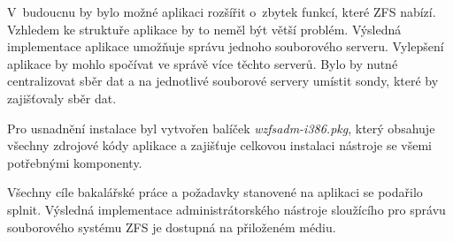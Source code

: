 V~budoucnu by bylo možné aplikaci rozšířit o~zbytek funkcí, které ZFS nabízí. Vzhledem ke struktuře aplikace by to neměl být větší problém. Výsledná implementace aplikace umožňuje správu jednoho souborového serveru. Vylepšení aplikace by mohlo spočívat ve správě více těchto serverů. Bylo by nutné centralizovat sběr dat a na jednotlivé souborové servery umístit sondy, které by zajišťovaly sběr dat.

Pro usnadnění instalace byl vytvořen balíček \emph{wzfsadm-i386.pkg}, který obsahuje všechny zdrojové kódy aplikace a zajišťuje celkovou instalaci nástroje se všemi potřebnými komponenty.

Všechny cíle bakalářské práce a požadavky stanovené na aplikaci se podařilo splnit. Výsledná implementace administrátorského nástroje sloužícího pro správu souborového systému ZFS je dostupná na přiloženém médiu.




